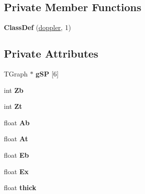 \subsection*{Private Member Functions}
\begin{DoxyCompactItemize}
\item 
\hypertarget{classdoppler_ade7546707b0924034fea20592ea8be3f}{{\bfseries Class\-Def} (\hyperlink{classdoppler}{doppler}, 1)}\label{classdoppler_ade7546707b0924034fea20592ea8be3f}

\end{DoxyCompactItemize}
\subsection*{Private Attributes}
\begin{DoxyCompactItemize}
\item 
\hypertarget{classdoppler_a68aa6852863cc61aac4b48232984d9e3}{T\-Graph $\ast$ {\bfseries g\-S\-P} \mbox{[}6\mbox{]}}\label{classdoppler_a68aa6852863cc61aac4b48232984d9e3}

\item 
\hypertarget{classdoppler_a9d471fcad9598fd2ade30e33fa975a68}{int {\bfseries Zb}}\label{classdoppler_a9d471fcad9598fd2ade30e33fa975a68}

\item 
\hypertarget{classdoppler_af8a5a56a1df23ebbad07fc02dc769301}{int {\bfseries Zt}}\label{classdoppler_af8a5a56a1df23ebbad07fc02dc769301}

\item 
\hypertarget{classdoppler_a5cade73bdf88628d2249fe132fafa09d}{float {\bfseries Ab}}\label{classdoppler_a5cade73bdf88628d2249fe132fafa09d}

\item 
\hypertarget{classdoppler_a74c6dbe49c10b46c6a7359d63bb2de70}{float {\bfseries At}}\label{classdoppler_a74c6dbe49c10b46c6a7359d63bb2de70}

\item 
\hypertarget{classdoppler_a9a878a5ca9fc4137f5947bb92d7425c2}{float {\bfseries Eb}}\label{classdoppler_a9a878a5ca9fc4137f5947bb92d7425c2}

\item 
\hypertarget{classdoppler_a98c25c360b741e6974ed025c4729a99e}{float {\bfseries Ex}}\label{classdoppler_a98c25c360b741e6974ed025c4729a99e}

\item 
\hypertarget{classdoppler_ae033bed03e9914f81466554748fb8f52}{float {\bfseries thick}}\label{classdoppler_ae033bed03e9914f81466554748fb8f52}


\end{DoxyCompactItemize}
